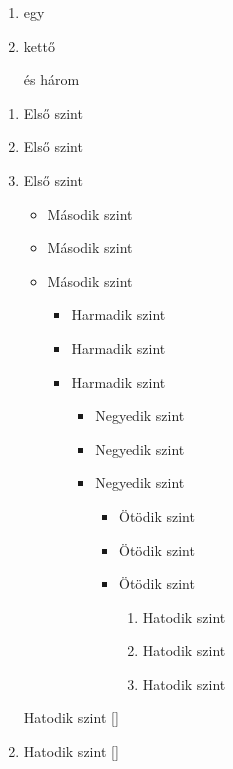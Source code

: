 \documentclass{article}
\begin{document}
\listoffigures
\newpage

\begin{enumerate}
\item egy
\item kettő
\item[és] három
\end{enumerate}

\begin{enumerate}
\item Első szint
\item Első szint
\item Első szint
\begin{itemize}
\item Második szint
\item Második szint
\item Második szint
\begin{itemize}
\item Harmadik szint
\item Harmadik szint
\item Harmadik szint
\begin{itemize}
\item Negyedik szint
\item Negyedik szint
\item Negyedik szint 
\begin{itemize}
\item Ötödik szint
\item Ötödik szint
\item Ötödik szint 
\begin{enumerate}[label=$\int$]
\item Hatodik szint
\item Hatodik szint
\item Hatodik szint 
\end{enumerate}

\end{itemize}
\end{itemize}
\end{itemize}
\end{itemize}
\end{enumerate}

\lipsum[1-2]
\begin{enumerate}[resume,label=$\int$]
\item[] Hatodik szint \label{} \ref{}
\item Hatodik szint \label{} \ref{}
\end{enumerate}

\begin{description}[align=parleft,leftmargin=*,widest={hosszabb}]
\item[címke] \lipsum[1]
\item \lipsum[2]
\item[ez egy hosszabb címke] \lipsum[3]
\end{description}
\end{document}
